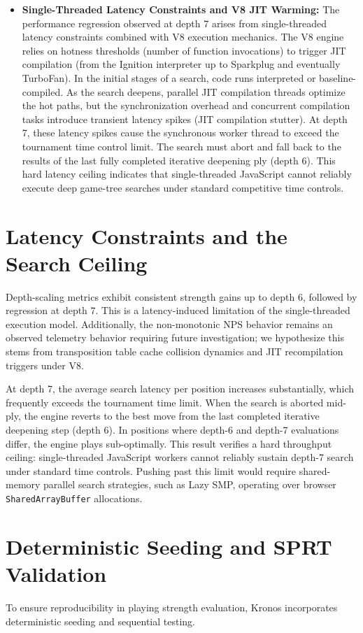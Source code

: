 \begin{itemize}
    \item \textbf{Single-Threaded Latency Constraints and V8 JIT Warming:} The performance regression observed at depth 7 arises from single-threaded latency constraints combined with V8 execution mechanics. The V8 engine relies on hotness thresholds (number of function invocations) to trigger JIT compilation (from the Ignition interpreter up to Sparkplug and eventually TurboFan). In the initial stages of a search, code runs interpreted or baseline-compiled. As the search deepens, parallel JIT compilation threads optimize the hot paths, but the synchronization overhead and concurrent compilation tasks introduce transient latency spikes (JIT compilation stutter). At depth 7, these latency spikes cause the synchronous worker thread to exceed the tournament time control limit. The search must abort and fall back to the results of the last fully completed iterative deepening ply (depth 6). This hard latency ceiling indicates that single-threaded JavaScript cannot reliably execute deep game-tree searches under standard competitive time controls.
\end{itemize}

\section{Latency Constraints and the Search Ceiling}
Depth-scaling metrics exhibit consistent strength gains up to depth 6, followed by regression at depth 7. This is a latency-induced limitation of the single-threaded execution model. Additionally, the non-monotonic NPS behavior remains an observed telemetry behavior requiring future investigation; we hypothesize this stems from transposition table cache collision dynamics and JIT recompilation triggers under V8.

At depth 7, the average search latency per position increases substantially, which frequently exceeds the tournament time limit. When the search is aborted mid-ply, the engine reverts to the best move from the last completed iterative deepening step (depth 6). In positions where depth-6 and depth-7 evaluations differ, the engine plays sub-optimally. This result verifies a hard throughput ceiling: single-threaded JavaScript workers cannot reliably sustain depth-7 search under standard time controls. Pushing past this limit would require shared-memory parallel search strategies, such as Lazy SMP, operating over browser \texttt{SharedArrayBuffer} allocations.

\section{Deterministic Seeding and SPRT Validation}
\label{sec:deterministic_validation}
To ensure reproducibility in playing strength evaluation, Kronos incorporates deterministic seeding and sequential testing.

